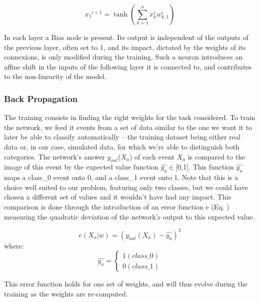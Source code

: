 \begin{equation}
    {x_1}^{i+1} = \tanh \left(\sum_{k=1}^{n}{x_k ^{i}w_{k,1}^{i}} \right) \dot{}
    \label{AQSD}
\end{equation}

 In each layer a Bias node is present. Its output is independent of the outputs of the previous layer, often set to 1, and its impact, dictated by the weights of its connexions, is only modified during the training. Such a neuron introduces an affine shift in the inputs of the following layer it is connected to, and contributes to the non-linearity of the model.

\subsubsection{Back Propagation}

\qquad The training consists in finding the right weights for the task considered. To train the network, we feed it events from a set of data similar to the one we want it to later be able to classify automatically – the training dataset being either real data or, in our case, simulated data, for which we’re able to distinguish both categories. The network’s answer $y_{out}$($X_a$) of each event $X_a$ is compared to the image of this event by the expected value function $\hat{y_a}$$\in$[0,1]. This function $\hat{y_a}$ maps a class\_0 event onto 0, and a class\_1 event onto 1. Note that this is a choice well suited to our problem, featuring only two classes, but we could have chosen a different set of values and it wouldn’t have had any impact. This comparison is done through the introduction of an error function e (Eq. ) measuring the quadratic deviation of the network’s output to this expected value.

\begin{equation}
    e(X_a|w) = \left(y_{out}(X_a)-\hat{y_a}\right)^2
    \label{Tmunu}
\end{equation}
where:
\begin{equation}
    \hat{y_a} = \left\{
    	\begin{array}{ll}
			1 (class\_0) \\
            0 (class\_1)
    	\end{array}
   	\right.
    \label{YYaYeYwY}
\end{equation}

This error function holds for one set of weights, and will thus evolve during the training as the weights are re-computed. 

